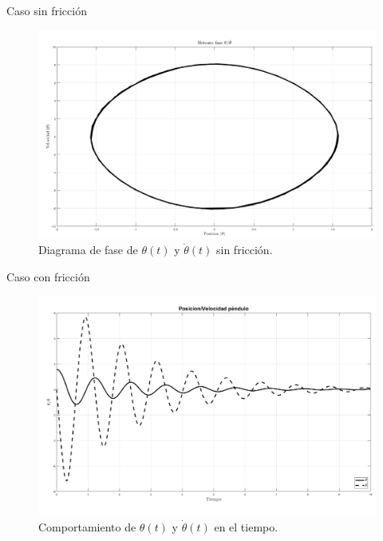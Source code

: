 \documentclass{beamer}
\begin{document}
\begin{frame}{Caso sin fricción}
\begin{figure}[hb!]
 \centering 
 \includegraphics[scale=0.2]{../Report/img/faseNF.png}
\caption{Diagrama de fase de $\theta(t)$ y $\dot{\theta}(t)$ sin fricción.}
 \label{fig: phase plot theta no friction}
\end{figure}

\end{frame}


\begin{frame}{Caso con fricción}
\begin{figure}[hb!]
 \centering 
 \includegraphics[scale=0.2]{../Report/img/PosVelF.png}
 \caption{Comportamiento de $\theta(t)$ y $\dot{\theta}(t)$ en el tiempo.}
 \label{fig: time plot theta dtheta friction}
\end{figure}

\end{frame}
\end{document}
